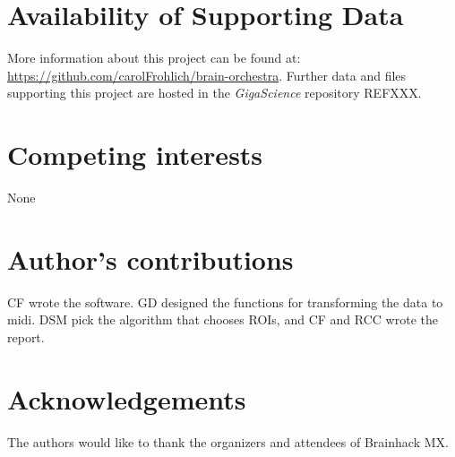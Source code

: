 \documentclass[twocolumn]{bmcart}%
\begin{document}

\begin{backmatter}

\section*{Availability of Supporting Data}
More information about this project can be found at: \url{https://github.com/carolFrohlich/brain-orchestra}. Further data and files supporting this project are hosted in the \emph{GigaScience} repository REFXXX.

\section*{Competing interests}
None

\section*{Author's contributions}
CF wrote the software. GD designed the functions for transforming the
data to midi. DSM pick the algorithm that chooses ROIs, and CF and RCC
wrote the report.

\section*{Acknowledgements}
The authors would like to thank the organizers and attendees of
Brainhack MX.

  
  


\end{backmatter}
\end{document}
